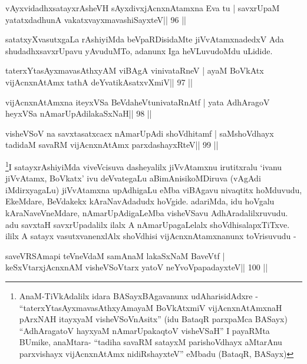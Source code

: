 
\begin{shl}
vAyxvidadhxsatayxrAsheVH sAyxdivxjAcnxnAtamxna Eva tu |
savxrUpaM yatatxdadhunA vakatxvayxmavashiSayxteV\hfill || 96 ||
\end{shl}

\begin{artha}
satatxyXvasutxgaLa rAshiyiMda beVpaRDisidaMte jiVvAtamxnadedxV Ada
shudadhxsavxrUpavu yAvuduMTo, adanunx Iga heVLuvudoMdu uLidide.
\end{artha}

\begin{shl}
taterxYtasAyxmavasAthxyAM viBAgA vinivataRneV |
ayaM BoVkAtx vijAcnxnAtAmx tathA deYvatikAsatxvXmiV\hfill || 97 ||
\end{shl}

\begin{shl}
vijAcnxnAtAmxna iteyxVSa BeVdaheVtunivataRnAtf |
yata AdhAragoV heyxVSa nAmarUpAdilakaSxNaH\hfill || 98 ||
\end{shl}

\begin{shl}
visheVSoV na savxtasatxcacx nAmarUpAdi shoVdhitamf |
saMshoVdhayx tadidaM savaRM vijAcnxnAtAmx parxdashayxRteV\hfill || 99 ||
\end{shl}

\begin{artha}
\footnote{AnaM-TiVkAdalilx idara BASayxBAgavanunx udAharisidAdxre -
``taterxYtasAyxmavasAthxyAmayaM BoVkAtx\s miV vijAcnxnAtAmxnaH
  pArxNAH itayxyaM visheVSoVnAsitx'' (idu BataqR parxpaMca BASayx)
  ``AdhAragatoV hayxyaM nAmarUpakaqtoV visheVSaH'' I payaRMta BUmike,
  anaMtara- ``tadiha savaRM satayxM parishoVdhayx aMtarA\s nu
  parxvishayx vijAcnxnAtAmx nidiRshayxteV'' eMbadu (BataqR, BASayx)}I 
  satayxrAshiyiMda viveVcisuva dasheyalilx jiVvAtamxnu
irutitxralu `ivanu jiVvAtamx, BoVkatx' ivu deVvategaLu
aBimAnisikoMDiruva (vAgAdi iMdirxyagaLu) jiVvAtamxna upAdhigaLu eMba
viBAgavu nivaqtitx hoMduvudu, EkeMdare, BeVdakekx kAraNavAdadudx
hoVgide. adariMda, idu hoVgalu kAraNaveVneMdare, nAmarUpAdigaLeMba
visheVSavu AdhAradalilxruvudu. adu savxtaH savxrUpadalilx ilalx A
nAmarUpagaLelalx shoVdhisalapxTiTxve. ililx A satayx vasutxvanenxlAlx
shoVdhisi vijAcnxnAtamxnanunx toVrisuvudu -
\end{artha}

\begin{shl}
saveVRSAmapi teVneVdaM samAnaM lakaSxNaM BaveVtf |
keSxVtarxjAcnxnAM visheVSoV\s tarx yatoV neYvoVpapadayxteV\hfill || 100 ||
\end{shl}

